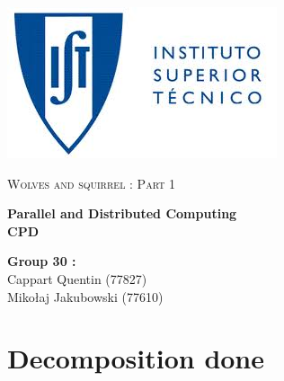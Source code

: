 \documentclass[a4paper,10pt]{article}
\begin{document}
\begin{flushleft}
\includegraphics[scale=0.3]{logo_ist.jpeg}
\end{flushleft}


\vspace{1cm}

\begin{center}{
\scshape{\LARGE Wolves and squirrel : Part 1 }}

\vspace{0.5cm}
\hbox{}
{\setlength{\parskip}{0.2cm}

 \Huge
 \bfseries
 \LARGE  Parallel and Distributed Computing
 \\
CPD \\

\vspace{0.2cm}

}
\vspace{0.5cm}

\hbox{}
\vspace{2.5cm}


\end{center}

\vspace{3cm}


\vfill
\begin{flushright}
\textbf{Group 30 :}\\
Cappart Quentin (77827)\\
Mikołaj Jakubowski (77610)\\

\end{flushright}
\newpage

\setcounter{page}{1}

\renewcommand\thepage{\arabic{page}}


\newpage

\section*{Decomposition done}
\end{document}
